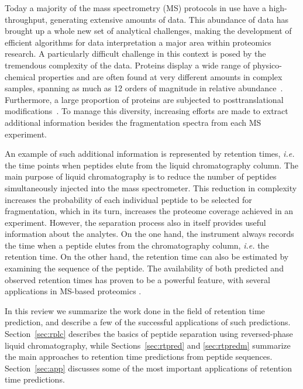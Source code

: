 \documentclass[a4paper]{article}
\begin{document}
Today a majority of the mass spectrometry (MS) protocols in use have a
high-throughput, generating extensive amounts of data. This abundance
of data has brought up a whole new set of analytical challenges,
making the development of efficient algorithms for data interpretation
a major area within proteomics research. A particularly difficult
challenge in this context is posed by the tremendous complexity of the
data.  Proteins display a wide range of physico-chemical properties
and are often found at very different amounts in complex samples,
spanning as much as 12 orders of magnitude in relative
abundance~\cite{Angel2012}.  Furthermore, a large proportion of
proteins are subjected to posttranslational
modifications~\cite{Lemeer2009}. To manage this diversity, increasing
efforts are made to extract additional information besides the
fragmentation spectra from each MS experiment.

An example of such additional information is represented by retention
times, {\em i.e.} the time points when peptides elute from the liquid
chromatography column.  The main purpose of liquid chromatography is
to reduce the number of peptides simultaneously injected into the mass
spectrometer. This reduction in complexity increases the probability
of each individual peptide to be selected for fragmentation, which in
its turn, increases the proteome coverage achieved in an experiment.
However, the separation process also in itself provides useful
information about the analytes. On the one hand, the instrument always
records the time when a peptide elutes from the chromatography column,
{\em i.e.}  the retention time. On the other hand, the retention time
can also be estimated by examining the sequence of the peptide. The
availability of both predicted and observed retention times has proven
to be a powerful feature, with several applications in MS-based
proteomics \cite{Palmblad2013}.

In this review we summarize the work done in the field of retention
time prediction, and describe a few of the successful applications of
such predictions. Section~\ref{sec:rplc} describes the basics of
peptide separation using reversed-phase liquid chromatography, while
Sections~\ref{sec:rtpred} and \ref{sec:rtpredm} summarize the main
approaches to retention time predictions from peptide
sequences. Section~\ref{sec:app} discusses some of the most important
applications of retention time predictions.


\end{document}
